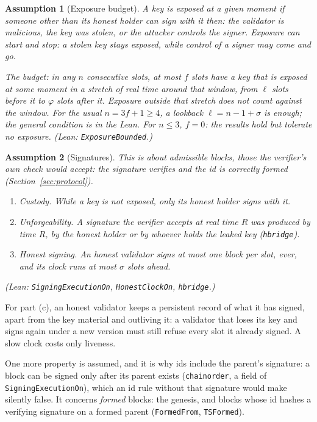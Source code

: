 \documentclass[10pt]{article}
\newtheorem{assumption}{Assumption}
\DeclareRobustCommand{\code}[1]{{\renewcommand{\_}{\textunderscore\allowbreak}\texttt{#1}}}
\newcommand{\fmax}{\ensuremath{f}}
\begin{document}
\begin{assumption}[Exposure budget]\label{ass:budget}
A key is \emph{exposed} at a given moment if someone other than its
honest holder can sign with it then: the validator is malicious, the key
was stolen, or the attacker controls the signer. Exposure can start and
stop: a stolen key stays exposed, while control of a signer may come and
go.

The budget: in any $n$ consecutive slots, at most $\fmax$ slots have a
key that is exposed at some moment in a stretch of real time around that
window, from $\ell$ slots before it to $\varphi$ slots after it.
Exposure outside that stretch does not count against the window. For
the usual $n = 3\fmax + 1 \ge 4$, a lookback $\ell = n - 1 + \sigma$ is
enough; the general condition is in the Lean. For $n \le 3$, $\fmax = 0$:
the results hold but tolerate no exposure.
\quad\textit{(Lean: \code{ExposureBounded}.)}
\end{assumption}

\begin{assumption}[Signatures]\label{ass:sig}
This is about \emph{admissible} blocks, those the verifier's own check
would accept: the signature verifies and the id is correctly formed
(Section~\ref{sec:protocol}).
\begin{enumerate}
\item[(a)] \emph{Custody.} While a key is not exposed, only its honest
  holder signs with it.
\item[(b)] \emph{Unforgeability.} A signature the verifier accepts at real
  time $R$ was produced by time $R$, by the honest holder or by whoever
  holds the leaked key (\code{hbridge}).
\item[(c)] \emph{Honest signing.} An honest validator signs at most one
  block per slot, ever, and its clock runs at most $\sigma$ slots ahead.
\end{enumerate}
\quad\textit{(Lean: \code{SigningExecutionOn}, \code{HonestClockOn},
\code{hbridge}.)}
\end{assumption}

For part (c), an
honest validator keeps a persistent record of what it has signed, apart
from the key material and outliving it: a validator that loses its key
and signs again under a new version must still refuse every slot it
already signed. A slow clock costs only liveness.

One more property is assumed, and it is why ids include the parent's
signature: a block can be signed only after its parent exists
(\code{chain\_order}, a field of \code{SigningExecutionOn}), which an id
rule without that signature would make silently false. It concerns
\emph{formed} blocks: the genesis, and blocks whose id hashes a verifying
signature on a formed parent (\code{FormedFrom}, \code{TSFormed}).
\end{document}
